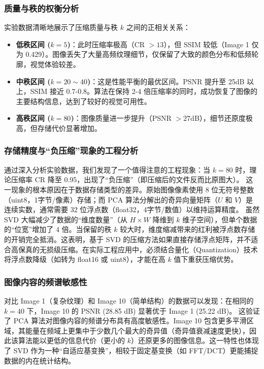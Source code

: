 \documentclass[12pt,a4paper]{article}
\begin{document}
\subsubsection{质量与秩的权衡分析}
实验数据清晰地展示了压缩质量与秩 $k$ 之间的正相关关系：
\begin{itemize}
    \item \textbf{低秩区间 ($k=5$)}：此时压缩率极高（CR $> 13$），但 SSIM 较低（Image 1 仅为 0.429）。图像丢失了大量高频纹理细节，仅保留了大致的颜色分布和低频轮廓，视觉体验较差。
    \item \textbf{中秩区间 ($k=20 \sim 40$)}：这是性能平衡的最优区间。PSNR 提升至 25dB 以上，SSIM 接近 0.7-0.8。算法在保持 2-4 倍压缩率的同时，成功恢复了图像的主要结构信息，达到了较好的视觉可用性。
    \item \textbf{高秩区间 ($k=80$)}：图像质量进一步提升（PSNR $> 27$dB），细节还原度极高，但存储代价显著增加。
\end{itemize}

\subsubsection{存储精度与“负压缩”现象的工程分析}
通过深入分析实验数据，我们发现了一个值得注意的工程现象：当 $k=80$ 时，理论压缩率 CR 降至 0.95，出现了“负压缩”（即压缩后的文件反而比原图大）。
这一现象的根本原因在于数据存储类型的差异。原始图像像素使用 8 位无符号整数（uint8，1字节/像素）存储；而 PCA 算法分解出的奇异向量矩阵（$U$ 和 $V$）是连续实数，通常需要 32 位浮点数（float32，4字节/数值）以维持运算精度。
虽然 SVD 大幅减少了数据的“维度数量”（从 $H \times W$ 降维到 $k$ 维子空间），但单个数据的“位宽”增加了 4 倍。当保留的秩 $k$ 较大时，维度缩减带来的红利被浮点数存储的开销完全抵消。这表明，基于 SVD 的压缩方法如果直接存储浮点矩阵，并不适合高保真的无损级压缩。在实际工程应用中，必须结合量化（Quantization）技术将浮点数降级（如转为 float16 或 uint8），才能在高 $k$ 值下重获压缩优势。

\subsubsection{图像内容的频谱敏感性}
对比 Image 1（复杂纹理）和 Image 10（简单结构）的数据可以发现：在相同的 $k=40$ 下，Image 10 的 PSNR (28.85 dB) 显著优于 Image 1 (25.22 dB)。
这验证了 PCA 算法对图像内容的频谱分布具有高度敏感性。Image 10 包含更多平滑区域，其能量在频域上更集中于少数几个最大的奇异值（奇异值衰减速度更快），因此该算法能以更低的信息代价（更小的 $k$）还原更多的图像信息。这一特性也体现了 SVD 作为一种“自适应基变换”，相较于固定基变换（如 FFT/DCT）更能捕捉数据的内在统计结构。
\end{document}
